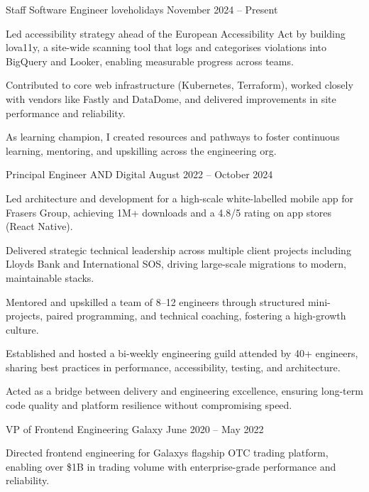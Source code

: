 \documentclass[]{resume-format}
\begin{document}
\begin{cventries}
    \cventry
    { Staff Software Engineer }
    { loveholidays }
    {}
    { November 2024 – Present }
    {\begin{cvitems}
        \item { Led accessibility strategy ahead of the European Accessibility Act by building lova11y, a site-wide scanning tool that logs and categorises violations into BigQuery and Looker, enabling measurable progress across teams. }
        \item { Contributed to core web infrastructure (Kubernetes, Terraform), worked closely with vendors like Fastly and DataDome, and delivered improvements in site performance and reliability. }
        \item { As learning champion, I created resources and pathways to foster continuous learning, mentoring, and upskilling across the engineering org. }
    \end{cvitems}}
    \cventry
    { Principal Engineer }
    { AND Digital }
    {}
    { August 2022 – October 2024 }
    {\begin{cvitems}
        \item { Led architecture and development for a high-scale white-labelled mobile app for Frasers Group, achieving 1M+ downloads and a 4.8/5 rating on app stores (React Native). }
        \item { Delivered strategic technical leadership across multiple client projects including Lloyds Bank and International SOS, driving large-scale migrations to modern, maintainable stacks. }
        \item { Mentored and upskilled a team of 8–12 engineers through structured mini-projects, paired programming, and technical coaching, fostering a high-growth culture. }
        \item { Established and hosted a bi-weekly engineering guild attended by 40+ engineers, sharing best practices in performance, accessibility, testing, and architecture. }
        \item { Acted as a bridge between delivery and engineering excellence, ensuring long-term code quality and platform resilience without compromising speed. }
    \end{cvitems}}
    \cventry
    { VP of Frontend Engineering }
    { Galaxy }
    {}
    { June 2020 – May 2022 }
    {\begin{cvitems}
        \item { Directed frontend engineering for Galaxy\textquotesingle{}s flagship OTC trading platform, enabling over \$1B in trading volume with enterprise-grade performance and reliability. }

\end{cvitems}}
\end{cventries}
\end{document}
